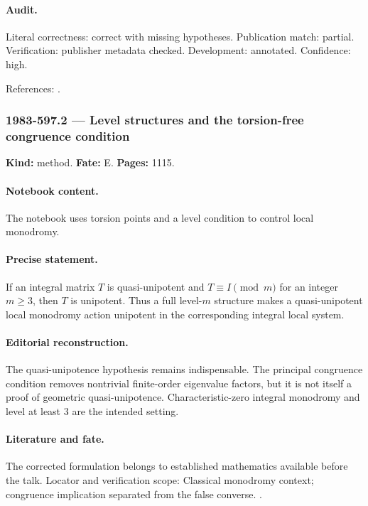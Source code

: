 \paragraph{Audit.} Literal correctness: correct with missing hypotheses. Publication match: partial. Verification: publisher metadata checked. Development: annotated. Confidence: high.

\noindent References: \citep{faltings1983arakelov,schmid1973variation}.\par

\subsubsection{1983-597.2 --- Level structures and the torsion-free congruence condition}

\label{item:1983-597.2}

\noindent\textbf{Kind:} method. \textbf{Fate:} E. \textbf{Pages:} 1115.\par

\paragraph{Notebook content.} The notebook uses torsion points and a level condition to control local monodromy.

\paragraph{Precise statement.} If an integral matrix \(T\) is quasi-unipotent and \(T\equiv I\pmod m\) for an integer \(m\ge3\), then \(T\) is unipotent. Thus a full level-\(m\) structure makes a quasi-unipotent local monodromy action unipotent in the corresponding integral local system.

\paragraph{Editorial reconstruction.} The quasi-unipotence hypothesis remains indispensable. The principal congruence condition removes nontrivial finite-order eigenvalue factors, but it is not itself a proof of geometric quasi-unipotence. Characteristic-zero integral monodromy and level at least 3 are the intended setting.

\paragraph{Literature and fate.} The corrected formulation belongs to established mathematics available before the talk. Locator and verification scope: Classical monodromy context; congruence implication separated from the false converse. \cite{schmid1973variation}.


